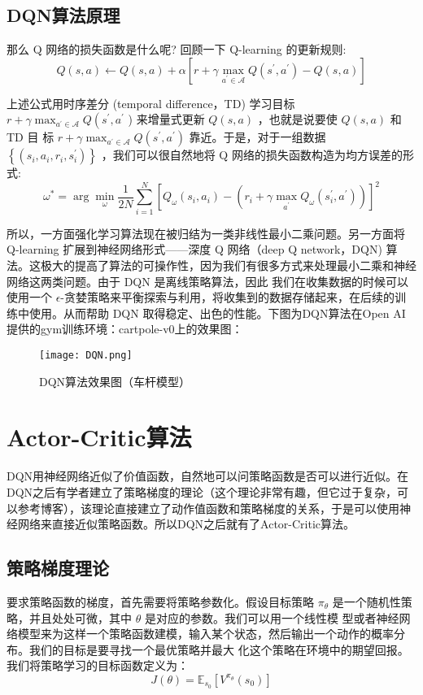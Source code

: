 \subsection{DQN算法原理}
那么 $\mathrm{Q}$ 网络的损失函数是什么呢? 回顾一下 Q-learning 的更新规则:
$$
Q(s, a) \leftarrow Q(s, a)+\alpha\left[r+\gamma \max _{a^{\prime} \in \mathcal{A}} Q\left(s^{\prime}, a^{\prime}\right)-Q(s, a)\right]
$$

上述公式用时序差分 (temporal difference，TD) 学习目标 $r+\gamma \max _{a^{\prime} \in \mathcal{A}} Q\left(s^{\prime}, a^{\prime}\right.$ ) 来增量式更新 $Q(s, a)$ ，也就是说要使 $Q(s, a)$ 和 TD 目 标 $r+\gamma \max _{a^{\prime} \in \mathcal{A}} Q\left(s^{\prime}, a^{\prime}\right)$ 靠近。于是，对于一组数据 $\left\{\left(s_{i}, a_{i}, r_{i}, s_{i}^{\prime}\right)\right\}$ ，我们可以很自然地将 Q 网络的损失函数构造为均方误差的形式:
$$
\omega^{*}=\arg \min _{\omega} \frac{1}{2 N} \sum_{i=1}^{N}\left[Q_{\omega}\left(s_{i}, a_{i}\right)-\left(r_{i}+\gamma \max _{a^{\prime}} Q_{\omega}\left(s_{i}^{\prime}, a^{\prime}\right)\right)\right]^{2}
$$

所以，一方面强化学习算法现在被归结为一类非线性最小二乘问题。另一方面将 Q-learning 扩展到神经网络形式——深度 Q 网络（deep Q network，DQN) 算法。这极大的提高了算法的可操作性，因为我们有很多方式来处理最小二乘和神经网络这两类问题。由于 DQN 是离线策略算法，因此 我们在收集数据的时候可以使用一个 $\epsilon$-贪婪策略来平衡探索与利用，将收集到的数据存储起来，在后续的训练中使用。从而帮助 DQN 取得稳定、出色的性能。下图为DQN算法在Open AI提供的gym训练环境：cartpole-v0上的效果图：
\begin{figure}[hbt]
    \centering
    \texttt{[image: DQN.png]}
	\vspace{-0.5cm}
    \caption{DQN算法效果图（车杆模型）}
    \label{DQN}
\end{figure}

\section{Actor-Critic算法}
DQN用神经网络近似了价值函数，自然地可以问策略函数是否可以进行近似。在DQN之后有学者建立了策略梯度的理论（这个理论非常有趣，但它过于复杂，可以参考博客\cite{PG}），该理论直接建立了动作值函数和策略梯度的关系，于是可以使用神经网络来直接近似策略函数。所以DQN之后就有了Actor-Critic算法。
\subsection{策略梯度理论}
要求策略函数的梯度，首先需要将策略参数化。假设目标策略 $\pi_{\theta}$ 是一个随机性策略，并且处处可微，其中 $\theta$ 是对应的参数。我们可以用一个线性模 型或者神经网络模型来为这样一个策略函数建模，输入某个状态，然后输出一个动作的概率分布。我们的目标是要寻找一个最优策略并最大 化这个策略在环境中的期望回报。我们将策略学习的目标函数定义为：
$$
J(\theta)=\mathbb{E}_{s_{0}}\left[V^{\pi_{\theta}}\left(s_{0}\right)\right]
$$

